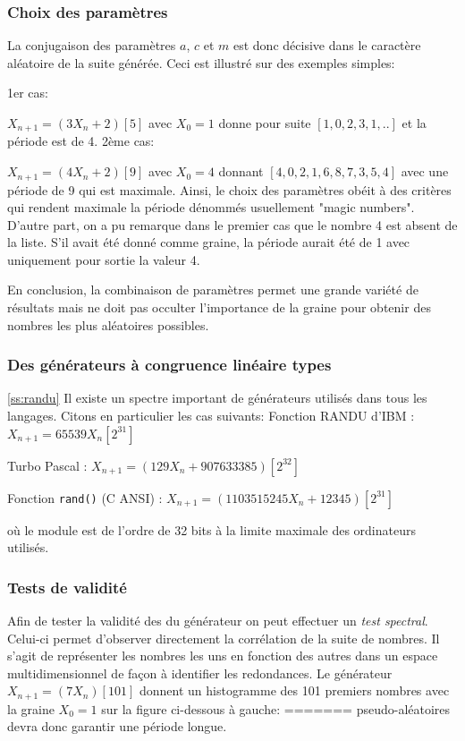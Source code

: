 \documentclass{scrartcl}
\begin{document}
\subsubsection{Choix des paramètres}
La conjugaison des paramètres $a$, $c$ et $m$ est donc décisive dans le
caractère aléatoire de la suite générée. Ceci est illustré sur des exemples
simples:

1er cas:\par
$X_{n+1} = (3 X_n +2)[5]$ avec $X_0 = 1$ donne pour suite $[1,0,2,3,1,..]$ et la
période est de 4.  2ème cas:\par
$X_{n+1} = (4 X_n +2)[9]$ avec $X_0 = 4$ donnant $[4,0,2,1,6,8,7,3,5,4]$ avec
une période de 9 qui est maximale.  Ainsi, le choix des paramètres obéit à des
critères qui rendent maximale la période dénommés usuellement "magic numbers".
D'autre part, on a pu remarque dans le premier cas que le nombre 4 est absent de
la liste. S'il avait été donné comme graine, la période aurait été de 1 avec
uniquement pour sortie la valeur 4.

En conclusion, la combinaison de paramètres permet une grande variété de
résultats mais ne doit pas occulter l'importance de la graine pour obtenir des
nombres les plus aléatoires possibles.

\subsubsection{Des générateurs à congruence linéaire types}\ref{ss:randu}
Il existe un spectre important de générateurs utilisés dans tous les
langages. Citons en particulier les cas suivants: Fonction RANDU d'IBM :
$X_{n+1} =65539 X_{n} [2^{31}]$\par
Turbo Pascal : $X_{n+1} =(129 X_{n} + 907633385)[2^{32}]$\par
Fonction \texttt{rand()} (C ANSI) :
$X_{n+1} =(1103515245 X_{n}+12345) [2^{31}]$\par
où le module est de l'ordre de 32 bits à la limite maximale des ordinateurs
utilisés.

\subsubsection{Tests de validité}
Afin de tester la validité des du générateur on peut effectuer un \textit{ test
  spectral}. Celui-ci permet d'observer directement la corrélation de la suite
de nombres.  Il s'agit de représenter les nombres les uns en fonction des autres
dans un espace multidimensionnel de façon à identifier les redondances.  Le
générateur $X_{n+1} =(7 X_{n})[101]$ donnent un histogramme des 101 premiers
nombres avec la graine $X_0 = 1$ sur la figure ci-dessous à gauche:
=======
pseudo-aléatoires devra donc garantir une période longue.
\end{document}
